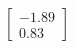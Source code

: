 \documentclass[preview]{standalone}
\begin{document}
\begin{align*}
\begin{bmatrix} -1.89 \\ 0.83 \end{bmatrix}
\end{align*}
\end{document}
